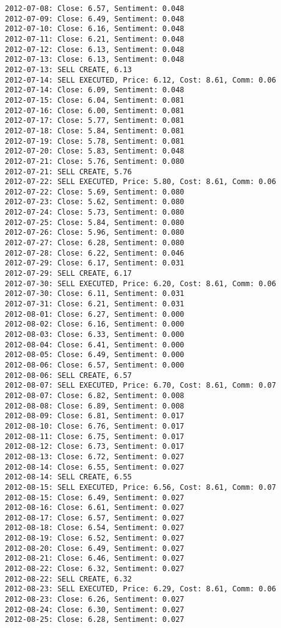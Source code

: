 \documentclass[11pt]{article}
\begin{document}
\begin{Verbatim}[commandchars=\\\{\}]
2012-07-08: Close: 6.57, Sentiment: 0.048
2012-07-09: Close: 6.49, Sentiment: 0.048
2012-07-10: Close: 6.16, Sentiment: 0.048
2012-07-11: Close: 6.21, Sentiment: 0.048
2012-07-12: Close: 6.13, Sentiment: 0.048
2012-07-13: Close: 6.13, Sentiment: 0.048
2012-07-13: SELL CREATE, 6.13
2012-07-14: SELL EXECUTED, Price: 6.12, Cost: 8.61, Comm: 0.06
2012-07-14: Close: 6.09, Sentiment: 0.048
2012-07-15: Close: 6.04, Sentiment: 0.081
2012-07-16: Close: 6.00, Sentiment: 0.081
2012-07-17: Close: 5.77, Sentiment: 0.081
2012-07-18: Close: 5.84, Sentiment: 0.081
2012-07-19: Close: 5.78, Sentiment: 0.081
2012-07-20: Close: 5.83, Sentiment: 0.048
2012-07-21: Close: 5.76, Sentiment: 0.080
2012-07-21: SELL CREATE, 5.76
2012-07-22: SELL EXECUTED, Price: 5.80, Cost: 8.61, Comm: 0.06
2012-07-22: Close: 5.69, Sentiment: 0.080
2012-07-23: Close: 5.62, Sentiment: 0.080
2012-07-24: Close: 5.73, Sentiment: 0.080
2012-07-25: Close: 5.84, Sentiment: 0.080
2012-07-26: Close: 5.96, Sentiment: 0.080
2012-07-27: Close: 6.28, Sentiment: 0.080
2012-07-28: Close: 6.22, Sentiment: 0.046
2012-07-29: Close: 6.17, Sentiment: 0.031
2012-07-29: SELL CREATE, 6.17
2012-07-30: SELL EXECUTED, Price: 6.20, Cost: 8.61, Comm: 0.06
2012-07-30: Close: 6.11, Sentiment: 0.031
2012-07-31: Close: 6.21, Sentiment: 0.031
2012-08-01: Close: 6.27, Sentiment: 0.000
2012-08-02: Close: 6.16, Sentiment: 0.000
2012-08-03: Close: 6.33, Sentiment: 0.000
2012-08-04: Close: 6.41, Sentiment: 0.000
2012-08-05: Close: 6.49, Sentiment: 0.000
2012-08-06: Close: 6.57, Sentiment: 0.000
2012-08-06: SELL CREATE, 6.57
2012-08-07: SELL EXECUTED, Price: 6.70, Cost: 8.61, Comm: 0.07
2012-08-07: Close: 6.82, Sentiment: 0.008
2012-08-08: Close: 6.89, Sentiment: 0.008
2012-08-09: Close: 6.81, Sentiment: 0.017
2012-08-10: Close: 6.76, Sentiment: 0.017
2012-08-11: Close: 6.75, Sentiment: 0.017
2012-08-12: Close: 6.73, Sentiment: 0.017
2012-08-13: Close: 6.72, Sentiment: 0.027
2012-08-14: Close: 6.55, Sentiment: 0.027
2012-08-14: SELL CREATE, 6.55
2012-08-15: SELL EXECUTED, Price: 6.56, Cost: 8.61, Comm: 0.07
2012-08-15: Close: 6.49, Sentiment: 0.027
2012-08-16: Close: 6.61, Sentiment: 0.027
2012-08-17: Close: 6.57, Sentiment: 0.027
2012-08-18: Close: 6.54, Sentiment: 0.027
2012-08-19: Close: 6.52, Sentiment: 0.027
2012-08-20: Close: 6.49, Sentiment: 0.027
2012-08-21: Close: 6.46, Sentiment: 0.027
2012-08-22: Close: 6.32, Sentiment: 0.027
2012-08-22: SELL CREATE, 6.32
2012-08-23: SELL EXECUTED, Price: 6.29, Cost: 8.61, Comm: 0.06
2012-08-23: Close: 6.26, Sentiment: 0.027
2012-08-24: Close: 6.30, Sentiment: 0.027
2012-08-25: Close: 6.28, Sentiment: 0.027

\end{Verbatim}
\end{document}
